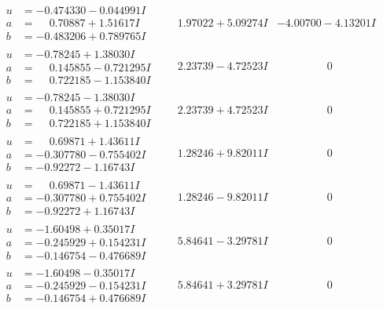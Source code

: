 \documentclass[1p]{elsarticle_modified}
\theoremstyle{definition}
\begin{document}
$$\begin{array}{c|c|c}
\begin{aligned}
u &= -0.474330 - 0.044991 I \\
a &= \phantom{-}0.70887 + 1.51617 I \\
b &= -0.483206 + 0.789765 I\end{aligned}
 & \phantom{-}1.97022 + 5.09274 I & -4.00700 - 4.13201 I \\ \hline\begin{aligned}
u &= -0.78245 + 1.38030 I \\
a &= \phantom{-}0.145855 - 0.721295 I \\
b &= \phantom{-}0.722185 - 1.153840 I\end{aligned}
 & \phantom{-}2.23739 - 4.72523 I & \phantom{-0.000000 } 0 \\ \hline\begin{aligned}
u &= -0.78245 - 1.38030 I \\
a &= \phantom{-}0.145855 + 0.721295 I \\
b &= \phantom{-}0.722185 + 1.153840 I\end{aligned}
 & \phantom{-}2.23739 + 4.72523 I & \phantom{-0.000000 } 0 \\ \hline\begin{aligned}
u &= \phantom{-}0.69871 + 1.43611 I \\
a &= -0.307780 - 0.755402 I \\
b &= -0.92272 - 1.16743 I\end{aligned}
 & \phantom{-}1.28246 + 9.82011 I & \phantom{-0.000000 } 0 \\ \hline\begin{aligned}
u &= \phantom{-}0.69871 - 1.43611 I \\
a &= -0.307780 + 0.755402 I \\
b &= -0.92272 + 1.16743 I\end{aligned}
 & \phantom{-}1.28246 - 9.82011 I & \phantom{-0.000000 } 0 \\ \hline\begin{aligned}
u &= -1.60498 + 0.35017 I \\
a &= -0.245929 + 0.154231 I \\
b &= -0.146754 - 0.476689 I\end{aligned}
 & \phantom{-}5.84641 - 3.29781 I & \phantom{-0.000000 } 0 \\ \hline\begin{aligned}
u &= -1.60498 - 0.35017 I \\
a &= -0.245929 - 0.154231 I \\
b &= -0.146754 + 0.476689 I\end{aligned}
 & \phantom{-}5.84641 + 3.29781 I & \phantom{-0.000000 } 0\\

\end{array}$$
\end{document}
